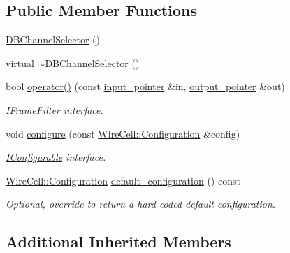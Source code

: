 \subsection*{Public Member Functions}
\begin{DoxyCompactItemize}
\item 
\hyperlink{class_wire_cell_1_1_sig_proc_1_1_d_b_channel_selector_acc683aea6877571f4891edb0be4ddf7d}{D\+B\+Channel\+Selector} ()
\item 
virtual \hyperlink{class_wire_cell_1_1_sig_proc_1_1_d_b_channel_selector_a9133412e08394162408d031e43231ba7}{$\sim$\+D\+B\+Channel\+Selector} ()
\item 
bool \hyperlink{class_wire_cell_1_1_sig_proc_1_1_d_b_channel_selector_aed483bbdb14a86719f307749becf7695}{operator()} (const \hyperlink{class_wire_cell_1_1_i_function_node_a55c0946156df9b712b8ad1a0b59b2db6}{input\+\_\+pointer} \&in, \hyperlink{class_wire_cell_1_1_i_function_node_afc02f1ec60d31aacddf64963f9ca650b}{output\+\_\+pointer} \&out)
\begin{DoxyCompactList}\small\item\em \hyperlink{class_wire_cell_1_1_i_frame_filter}{I\+Frame\+Filter} interface. \end{DoxyCompactList}\item 
void \hyperlink{class_wire_cell_1_1_sig_proc_1_1_d_b_channel_selector_ab4b1fc4f57e0d9e9695a962c39ea7a71}{configure} (const \hyperlink{namespace_wire_cell_a9f705541fc1d46c608b3d32c182333ee}{Wire\+Cell\+::\+Configuration} \&config)
\begin{DoxyCompactList}\small\item\em \hyperlink{class_wire_cell_1_1_i_configurable}{I\+Configurable} interface. \end{DoxyCompactList}\item 
\hyperlink{namespace_wire_cell_a9f705541fc1d46c608b3d32c182333ee}{Wire\+Cell\+::\+Configuration} \hyperlink{class_wire_cell_1_1_sig_proc_1_1_d_b_channel_selector_a541cbeeeadfc258ed5e60357c5c7b3d0}{default\+\_\+configuration} () const
\begin{DoxyCompactList}\small\item\em Optional, override to return a hard-\/coded default configuration. \end{DoxyCompactList}\end{DoxyCompactItemize}
\subsection*{Additional Inherited Members}


